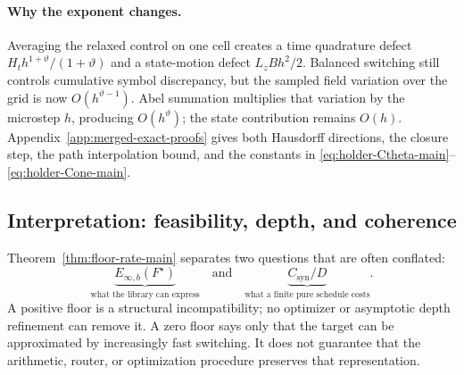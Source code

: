 \documentclass[twoside,11pt]{article}
\newcommand{\Rel}{\mathrm{rel}}
\newcommand{\RR}{\mathscr{R}}
\newcommand{\dH}{d_{\mathrm H}}
\begin{document}

\paragraph{Why the exponent changes.}
Averaging the relaxed control on one cell creates a time quadrature defect
$H_th^{1+\vartheta}/(1+\vartheta)$ and a state-motion defect
$L_zBh^2/2$.  Balanced switching still controls cumulative symbol discrepancy,
but the sampled field variation over the grid is now
$O(h^{\vartheta-1})$.  Abel summation multiplies that variation by the
microstep $h$, producing $O(h^\vartheta)$; the state contribution remains
$O(h)$.  Appendix~\ref{app:merged-exact-proofs} gives both Hausdorff
directions, the closure step, the path interpolation bound, and the constants
in \eqref{eq:holder-Ctheta-main}--\eqref{eq:holder-Cone-main}.


\subsection{Interpretation: feasibility, depth, and coherence}

Theorem~\ref{thm:floor-rate-main} separates two questions that are often conflated:
\begin{equation}
 \underbrace{E_{\infty,b}(F^\star)}_{\text{what the library can express}}
 \quad\text{and}\quad
 \underbrace{C_{\mathrm{syn}}/D}_{\text{what a finite pure schedule costs}}.
 \label{eq:floor-synthesis-split}
\end{equation}
A positive floor is a structural incompatibility; no optimizer or asymptotic depth refinement can remove it.  A zero floor says only that the target can be approximated by increasingly fast switching.  It does not guarantee that the arithmetic, router, or optimization procedure preserves that representation.
\end{document}
